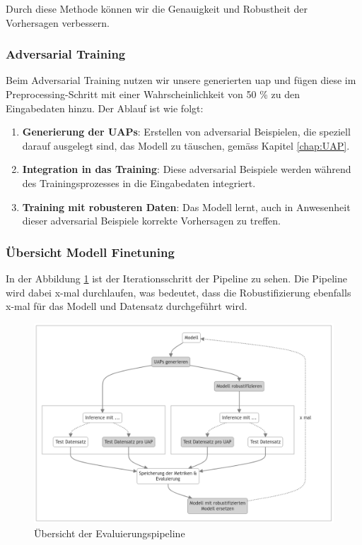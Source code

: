Durch diese Methode können wir die Genauigkeit und Robustheit der Vorhersagen verbessern.

\subsubsection{Adversarial Training} \label{chap:adversarial training}

Beim Adversarial Training nutzen wir unsere generierten \acrlong{uap} und fügen diese im Preprocessing-Schritt mit einer Wahrscheinlichkeit von 50 \% zu den Eingabedaten hinzu. Der Ablauf ist wie folgt:

\begin{enumerate}
    \item \textbf{Generierung der UAPs}: Erstellen von adversarial Beispielen, die speziell darauf ausgelegt sind, das Modell zu täuschen, gemäss Kapitel \ref{chap:UAP}.
    \item \textbf{Integration in das Training}: Diese adversarial Beispiele werden während des Trainingsprozesses in die Eingabedaten integriert.
    \item \textbf{Training mit robusteren Daten}: Das Modell lernt, auch in Anwesenheit dieser adversarial Beispiele korrekte Vorhersagen zu treffen.
\end{enumerate}


\subsubsection{Übersicht Modell Finetuning}
In der Abbildung \ref{fig:Evaluierungspipeline} ist der Iterationsschritt der Pipeline zu sehen. Die Pipeline wird dabei x-mal durchlaufen, was bedeutet, dass die Robustifizierung ebenfalls x-mal für das Modell und Datensatz durchgeführt wird.

\begin{figure}[H]
    \centering
    \includegraphics[width=\linewidth]{01-images/04-methodik/robustifizierungs-pipeline.png}
    \caption{Übersicht der Evaluierungspipeline}
    \label{fig:Evaluierungspipeline}
\end{figure}

